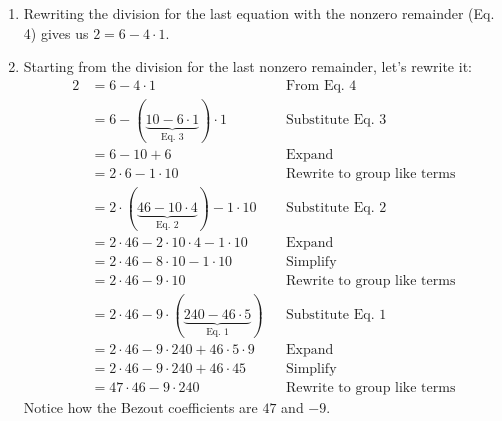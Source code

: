\documentclass[letterpaper]{article}
\begin{document}
\begin{mdframed}
\begin{enumerate}
        \item Rewriting the division for the last equation with the nonzero remainder (Eq. 4) gives us $2 = 6 - 4 \cdot 1.$
        \item Starting from the division for the last nonzero remainder, let's rewrite it: 
        \begin{equation*}
            \begin{aligned}
                2 &= 6 - 4 \cdot 1 && \text{From Eq. 4} \\ 
                    &= 6 - (\underbrace{10 - 6 \cdot 1}_{\text{Eq. 3}}) \cdot 1 && \text{Substitute Eq. 3} \\ 
                    &= 6 - 10 + 6 && \text{Expand} \\ 
                    &= 2 \cdot 6 - 1 \cdot 10 && \text{Rewrite to group like terms} \\ 
                    &= 2 \cdot (\underbrace{46 - 10 \cdot 4}_{\text{Eq. 2}}) - 1 \cdot 10 && \text{Substitute Eq. 2} \\ 
                    &= 2 \cdot 46 - 2 \cdot 10 \cdot 4 - 1 \cdot 10 && \text{Expand} \\ 
                    &= 2 \cdot 46 - 8 \cdot 10 - 1 \cdot 10 && \text{Simplify} \\ 
                    &= 2 \cdot 46 - 9 \cdot 10 && \text{Rewrite to group like terms} \\ 
                    &= 2 \cdot 46 - 9 \cdot (\underbrace{240 - 46 \cdot 5}_{\text{Eq. 1}}) && \text{Substitute Eq. 1} \\ 
                    &= 2 \cdot 46 - 9 \cdot 240 + 46 \cdot 5 \cdot 9 && \text{Expand} \\ 
                    &= 2 \cdot 46 - 9 \cdot 240 + 46 \cdot 45 && \text{Simplify} \\ 
                    &= 47 \cdot 46 - 9 \cdot 240 && \text{Rewrite to group like terms}
            \end{aligned}
        \end{equation*}
        Notice how the Bezout coefficients are $47$ and $-9$. 
    \end{enumerate}
\end{mdframed}
\end{document}
